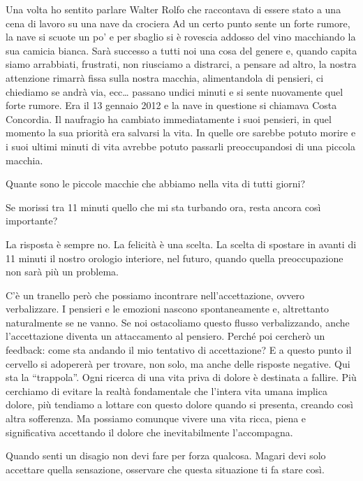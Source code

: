 \documentclass[12pt]{book} %
\begin{document}
Una volta ho sentito parlare Walter Rolfo che raccontava di essere stato a una cena di lavoro su una nave da crociera Ad
un certo punto sente un forte rumore, la nave si scuote un po' e per sbaglio si è rovescia addosso del vino macchiando
la sua camicia bianca. Sarà successo a tutti noi una cosa del genere e, quando capita siamo arrabbiati, frustrati, non
riusciamo a distrarci, a pensare ad altro, la nostra attenzione rimarrà fissa sulla nostra macchia, alimentandola di
pensieri, ci chiediamo se andrà via, ecc… passano undici minuti e si sente nuovamente quel forte rumore. Era il 13
gennaio 2012 e la nave in questione si chiamava Costa Concordia. Il naufragio ha cambiato immediatamente i suoi
pensieri, in quel momento la sua priorità era salvarsi la vita. In quelle ore sarebbe potuto morire e i suoi ultimi
minuti di vita avrebbe potuto passarli preoccupandosi di una piccola macchia.

Quante sono le piccole macchie che abbiamo nella vita di tutti giorni?

Se morissi tra 11 minuti quello che mi sta turbando ora, resta ancora così importante?

La risposta è sempre no. La felicità è una scelta. La scelta di spostare in avanti di 11 minuti il nostro orologio
interiore, nel futuro, quando quella preoccupazione non sarà più un problema.

C'è un tranello però che possiamo incontrare nell'accettazione, ovvero verbalizzare. I pensieri e
le emozioni nascono spontaneamente e, altrettanto naturalmente se ne vanno. Se noi ostacoliamo questo flusso
verbalizzando, anche l'accettazione diventa un attaccamento al pensiero. Perché poi cercherò un feedback: come sta
andando il mio tentativo di accettazione? E a questo punto il cervello si adopererà per trovare, non solo, ma anche
delle risposte negative. Qui sta la “trappola”. Ogni ricerca di una vita priva di dolore è destinata a fallire. Più
cerchiamo di evitare la realtà fondamentale che l'intera vita umana implica dolore, più tendiamo a
lottare con questo dolore quando si presenta, creando così altra sofferenza. Ma possiamo comunque vivere una vita
ricca, piena e significativa accettando il dolore che inevitabilmente l'accompagna.

Quando senti un disagio non devi fare per forza qualcosa. Magari devi solo accettare quella sensazione, osservare che
questa situazione ti fa stare così.
\end{document}

